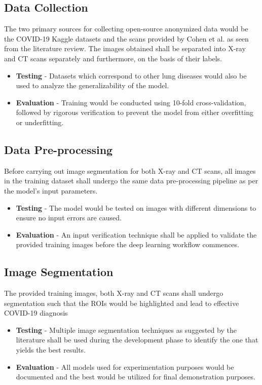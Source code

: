 \subsection{Data Collection}
The two primary sources for collecting open-source anonymized data would be the COVID-19 Kaggle datasets and the scans provided by Cohen et al. \cite{JMD2020} as seen from the literature review. The images obtained shall be separated into X-ray and CT scans separately and furthermore, on the basis of their labels.
\begin{itemize}
    \item \textbf{Testing} - Datasets which correspond to other lung diseases would also be used to analyze the generalizability of the model.
     \item \textbf{Evaluation} - Training would be conducted using  10-fold cross-validation, followed by rigorous verification to prevent the model from either overfitting or underfitting.
\end{itemize}

\subsection{Data Pre-processing}
Before carrying out image segmentation for both X-ray and CT scans, all images in the training dataset shall undergo the same data pre-processing pipeline as per the model's input parameters.
\begin{itemize}
    \item \textbf{Testing} - The model would be tested on images with different dimensions to ensure no input errors are caused.
     \item \textbf{Evaluation} - An input verification technique shall be applied to validate the provided training images before the deep learning workflow commences.
\end{itemize}

\subsection{Image Segmentation}
The provided training images, both X-ray and CT scans shall undergo segmentation such that the ROIs would be highlighted and lead to effective COVID-19 diagnosis
\begin{itemize}
    \item \textbf{Testing} - Multiple image segmentation techniques as suggested by the literature shall be used during the development phase to identify the one that yields the best results.
     \item \textbf{Evaluation} - All models used for experimentation purposes would be documented and the best would be utilized for final demonstration purposes.
\end{itemize}

